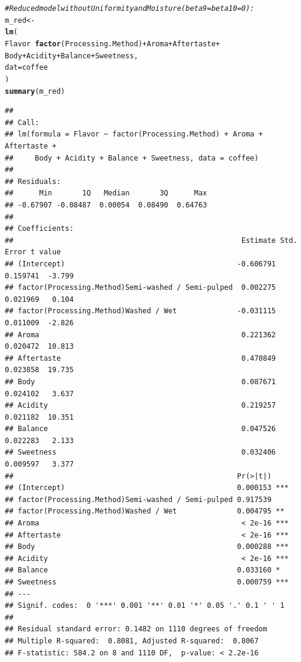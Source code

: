 \documentclass[oneside]{book}\usepackage[]{graphicx}\usepackage[dvipsnames,table,xcdraw]{xcolor}
\makeatletter
\newcommand{\hlcom}[1]{\textcolor[rgb]{0.678,0.584,0.686}{\textit{#1}}}%
\newcommand{\hlopt}[1]{\textcolor[rgb]{0,0,0}{#1}}%
\newcommand{\hlstd}[1]{\textcolor[rgb]{0.345,0.345,0.345}{#1}}%
\newcommand{\hlkwb}[1]{\textcolor[rgb]{0.69,0.353,0.396}{#1}}%
\newcommand{\hlkwc}[1]{\textcolor[rgb]{0.333,0.667,0.333}{#1}}%
\newcommand{\hlkwd}[1]{\textcolor[rgb]{0.737,0.353,0.396}{\textbf{#1}}}%
\newenvironment{kframe}{%
 \def\at@end@of@kframe{}%
 \ifinner\ifhmode%
  \def\at@end@of@kframe{\end{minipage}}%
  \begin{minipage}{\columnwidth}%
 \fi\fi%
 \def\FrameCommand##1{\hskip\@totalleftmargin \hskip-\fboxsep
 \colorbox{shadecolor}{##1}\hskip-\fboxsep
     \hskip-\linewidth \hskip-\@totalleftmargin \hskip\columnwidth}%
 \MakeFramed {\advance\hsize-\width
   \@totalleftmargin\z@ \linewidth\hsize
   \@setminipage}}%
 {\par\unskip\endMakeFramed%
 \at@end@of@kframe}
\newenvironment{knitrout}{}{} %
\makeatother
\begin{document}
\begin{knitrout}
\begin{kframe}
\begin{alltt}
\hlcom{# Reduced model without Uniformity and Moisture (beta9=beta10=0):}
\hlstd{m_red} \hlkwb{<-}
\hlkwd{lm}\hlstd{(}
\hlstd{Flavor} \hlopt{~} \hlkwd{factor}\hlstd{(Processing.Method)} \hlopt{+} \hlstd{Aroma} \hlopt{+} \hlstd{Aftertaste} \hlopt{+}
\hlstd{Body} \hlopt{+} \hlstd{Acidity} \hlopt{+} \hlstd{Balance} \hlopt{+} \hlstd{Sweetness,}
\hlkwc{dat} \hlstd{= coffee}
\hlstd{)}
\hlkwd{summary}\hlstd{(m_red)}
\end{alltt}
\begin{verbatim}
## 
## Call:
## lm(formula = Flavor ~ factor(Processing.Method) + Aroma + Aftertaste + 
##     Body + Acidity + Balance + Sweetness, data = coffee)
## 
## Residuals:
##      Min       1Q   Median       3Q      Max 
## -0.67907 -0.08487  0.00054  0.08490  0.64763 
## 
## Coefficients:
##                                                     Estimate Std. Error t value
## (Intercept)                                        -0.606791   0.159741  -3.799
## factor(Processing.Method)Semi-washed / Semi-pulped  0.002275   0.021969   0.104
## factor(Processing.Method)Washed / Wet              -0.031115   0.011009  -2.826
## Aroma                                               0.221362   0.020472  10.813
## Aftertaste                                          0.470849   0.023858  19.735
## Body                                                0.087671   0.024102   3.637
## Acidity                                             0.219257   0.021182  10.351
## Balance                                             0.047526   0.022283   2.133
## Sweetness                                           0.032406   0.009597   3.377
##                                                    Pr(>|t|)    
## (Intercept)                                        0.000153 ***
## factor(Processing.Method)Semi-washed / Semi-pulped 0.917539    
## factor(Processing.Method)Washed / Wet              0.004795 ** 
## Aroma                                               < 2e-16 ***
## Aftertaste                                          < 2e-16 ***
## Body                                               0.000288 ***
## Acidity                                             < 2e-16 ***
## Balance                                            0.033160 *  
## Sweetness                                          0.000759 ***
## ---
## Signif. codes:  0 '***' 0.001 '**' 0.01 '*' 0.05 '.' 0.1 ' ' 1
## 
## Residual standard error: 0.1482 on 1110 degrees of freedom
## Multiple R-squared:  0.8081,	Adjusted R-squared:  0.8067 
## F-statistic: 584.2 on 8 and 1110 DF,  p-value: < 2.2e-16
\end{verbatim}

\end{kframe}
\end{knitrout}
\end{document}
